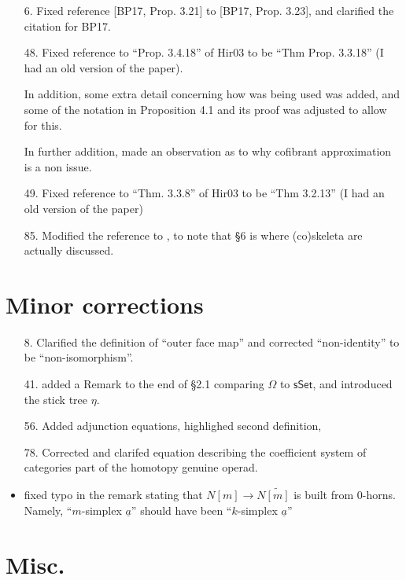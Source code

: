\documentclass{article}
\begin{document}
\begin{itemize}
\item[6.] Fixed reference [BP17, Prop. 3.21] to [BP17, Prop. 3.23], and clarified the citation for BP17.
\item[48.] Fixed reference to ``Prop. 3.4.18'' of Hir03 to be ``Thm Prop. 3.3.18'' (I had an old version of the paper).

In addition, some extra detail concerning how \cite[Prop. 3.3.18]{Hir03} was being used was added, and some of the notation in Proposition 4.1 and its proof was adjusted to allow for this.

In further addition, made an observation as to why cofibrant approximation is a non issue.

\item[49.] Fixed reference to ``Thm. 3.3.8'' of Hir03 to be ``Thm 3.2.13'' (I had an old version of the paper)

\item[85.] Modified the reference \cite[\S 4]{BM11} to \cite[\S 4,\S 6]{BM11}, to note that \S 6 is where (co)skeleta are actually discussed. 
\end{itemize}



\section{Minor corrections}

\begin{itemize}
\item[8.] Clarified the definition of ``outer face map'' and corrected ``non-identity'' to be ``non-isomorphism''.
\item[41.] added a Remark to the end of \S 2.1 comparing $\Omega$ to $\mathsf{sSet}$, and introduced the stick tree $\eta$.
\item[56.] Added adjunction equations, highlighed second definition, 
\item[78.] Corrected and clarifed equation describing the coefficient system of categories part of the homotopy genuine operad.
\item fixed typo in the remark stating that $N[m] \to N \widetilde{[m]}$ is built from $0$-horns. Namely, ``$m$-simplex $\underline{a}$'' should have been ``$k$-simplex $\underline{a}$''
\end{itemize}

\section{Misc.}
\end{document}
